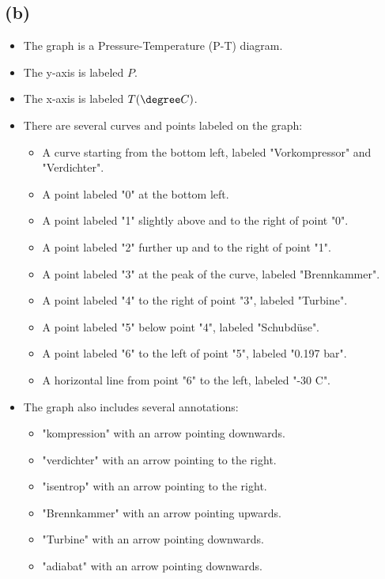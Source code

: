 

\subsection*{(b)}

\begin{itemize}
    \item The graph is a Pressure-Temperature (P-T) diagram.
    \item The y-axis is labeled \( P \).
    \item The x-axis is labeled \( T (\degree C) \).
    \item There are several curves and points labeled on the graph:
        \begin{itemize}
            \item A curve starting from the bottom left, labeled "Vorkompressor" and "Verdichter".
            \item A point labeled "0" at the bottom left.
            \item A point labeled "1" slightly above and to the right of point "0".
            \item A point labeled "2" further up and to the right of point "1".
            \item A point labeled "3" at the peak of the curve, labeled "Brennkammer".
            \item A point labeled "4" to the right of point "3", labeled "Turbine".
            \item A point labeled "5" below point "4", labeled "Schubdüse".
            \item A point labeled "6" to the left of point "5", labeled "0.197 bar".
            \item A horizontal line from point "6" to the left, labeled "-30 \degree C".
        \end{itemize}
    \item The graph also includes several annotations:
        \begin{itemize}
            \item "kompression" with an arrow pointing downwards.
            \item "verdichter" with an arrow pointing to the right.
            \item "isentrop" with an arrow pointing to the right.
            \item "Brennkammer" with an arrow pointing upwards.
            \item "Turbine" with an arrow pointing downwards.
            \item "adiabat" with an arrow pointing downwards.
        \end{itemize}
\end{itemize}

